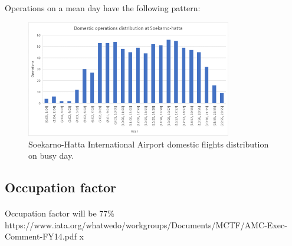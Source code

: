 Operations on a mean day have the following pattern:
\begin{figure}[H]
	\centering
	\includegraphics[clip, trim=0.1cm 0.1cm 0.1cm 0.1cm, width=0.8\textwidth]{./images/PROGNOSIS/hourDom}
	\caption{Soekarno-Hatta International Airport domestic flights distribution on busy day.}
	\label{hourDom}
\end{figure}

	
	\subsection{Occupation factor}
	\paragraph{} Occupation factor will be 77\%
	https://www.iata.org/whatwedo/workgroups/Documents/MCTF/AMC-Exec-Comment-FY14.pdf
	\cite{IATA_PLF}x
	
	